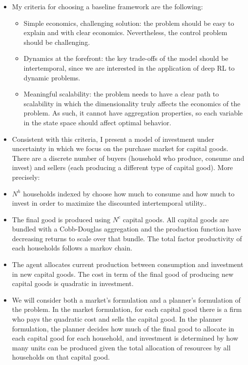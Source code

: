 \documentclass[11pt,english]{article}
\begin{document}
	\begin{itemize}
	
	\item My criteria for choosing a baseline framework are the following:
	
	\begin{itemize}
		\item Simple economics, challenging solution: the problem should be easy to explain and with clear economics. Nevertheless, the control problem should be challenging. \medskip
		
		\item Dynamics at the forefront: the key trade-offs of the model should be intertemporal, since we are interested in the application of deep RL to dynamic problems. \medskip
		
		\item Meaningful scalability: the problem needs to have a clear path to scalability in which the dimensionality truly affects the economics of the problem. As such, it cannot have aggregation properties, so each variable in the state space should affect optimal behavior. \medskip
	\end{itemize}

	\item Consistent with this criteria, I present a model of investment under uncertainty in which we focus on the purchase market for capital goods. There are a discrete number of buyers (household who produce, consume and invest) and sellers (each producing a different type of capital good). More precisely:
	

	\item $N^h$ households indexed by  choose how much to consume and how much to invest in order to maximize the discounted intertemporal utility..\medskip
	
	\item The final good is produced using $N^c$ capital goods. All capital goods are bundled with a Cobb-Douglas aggregation and the production function have decreasing returns to scale over that bundle. The  total factor productivity of each households follows a markov chain.   \medskip
	
	\item The agent allocates current production between consumption and investment in new capital goods. The cost in term of the final good of producing  new capital goods  is quadratic in investment.  \medskip
	
	\item  We will consider both a  market's formulation and a planner's formulation of the problem. In the market formulation, for each capital good there is a firm who pays the quadratic cost and sells the capital good. In the planner formulation, the planner decides how much of the final good to allocate in each capital good for each household, and investment is determined by how many units can be produced given the total allocation of resources by all households on that capital good. 
	

\end{itemize}
\end{document}
